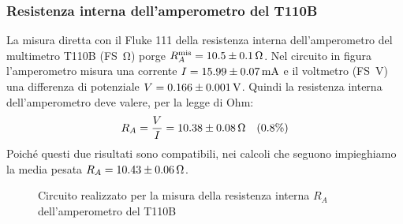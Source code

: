 \documentclass[italian,a4paper]{article}
\begin{document}
\subsubsection{Resistenza interna dell'amperometro del T110B}
La misura diretta con il Fluke 111 della resistenza interna dell'amperometro del multimetro T110B (FS~\unit[600]{\ohm}) porge $R_A^{\text{mis}} = \unit[10.5\pm0.1]{\ohm}$. Nel circuito in figura l'amperometro misura una corrente $I = \unit[15.99\pm0.07]{mA}$ e il voltmetro (FS~\unit[6]{V}) una differenza di potenziale $V=\unit[0.166\pm0.001]{V}$. Quindi la resistenza interna dell'amperometro deve valere, per la legge di Ohm:
\begin{equation*}
 R_A = \dfrac V I =  \unit[10.38\pm0.08]{\ohm} \quad (0.8\%)
\end{equation*}
Poiché questi due risultati sono compatibili, nei calcoli che seguono impieghiamo la media pesata $R_A = \unit[10.43\pm0.06]{\ohm}$.
\begin{figure}[h]\caption{Circuito realizzato per la misura della resistenza interna $R_A$ dell'amperometro del T110B}\label{RA}
\centering
 
\end{figure}
\end{document}

